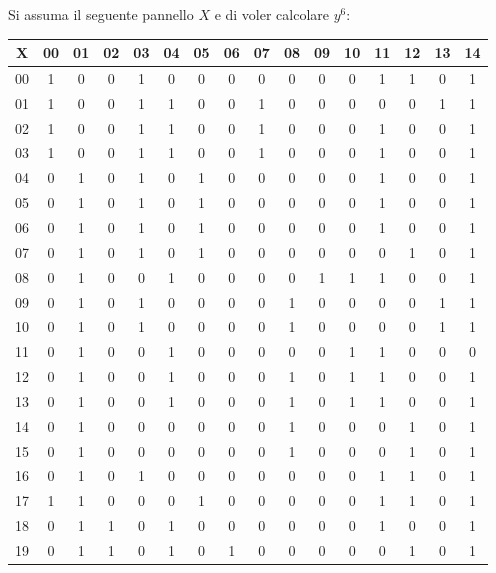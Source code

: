 \begin{esempio}
  \label{es:pbwt1}
  Si assuma il seguente pannello $X$ e di voler calcolare $y^6$:
  \begin{table}[H]
    \centering
    \scriptsize
    \begin{tabular}{c|ccccccccccccccc}
      X & 00 & 01 & 02 & 03 & 04 & 05 & 06 & 07 & 08 & 09 & 10 & 11 & 12 & 13
      & 14 \\
      \hline
      00 & 1 & 0 & 0 & 1 & 0 & 0 & 0 & 0 & 0 & 0 & 0 & 1 & 1 & 0 & 1 \\
      01 & 1 & 0 & 0 & 1 & 1 & 0 & 0 & 1 & 0 & 0 & 0 & 0 & 0 & 1 & 1 \\
      02 & 1 & 0 & 0 & 1 & 1 & 0 & 0 & 1 & 0 & 0 & 0 & 1 & 0 & 0 & 1 \\
      03 & 1 & 0 & 0 & 1 & 1 & 0 & 0 & 1 & 0 & 0 & 0 & 1 & 0 & 0 & 1 \\
      04 & 0 & 1 & 0 & 1 & 0 & 1 & 0 & 0 & 0 & 0 & 0 & 1 & 0 & 0 & 1 \\
      05 & 0 & 1 & 0 & 1 & 0 & 1 & 0 & 0 & 0 & 0 & 0 & 1 & 0 & 0 & 1 \\
      06 & 0 & 1 & 0 & 1 & 0 & 1 & 0 & 0 & 0 & 0 & 0 & 1 & 0 & 0 & 1 \\
      07 & 0 & 1 & 0 & 1 & 0 & 1 & 0 & 0 & 0 & 0 & 0 & 0 & 1 & 0 & 1 \\
      08 & 0 & 1 & 0 & 0 & 1 & 0 & 0 & 0 & 0 & 1 & 1 & 1 & 0 & 0 & 1 \\
      09 & 0 & 1 & 0 & 1 & 0 & 0 & 0 & 0 & 1 & 0 & 0 & 0 & 0 & 1 & 1 \\
      10 & 0 & 1 & 0 & 1 & 0 & 0 & 0 & 0 & 1 & 0 & 0 & 0 & 0 & 1 & 1 \\
      11 & 0 & 1 & 0 & 0 & 1 & 0 & 0 & 0 & 0 & 0 & 1 & 1 & 0 & 0 & 0 \\
      12 & 0 & 1 & 0 & 0 & 1 & 0 & 0 & 0 & 1 & 0 & 1 & 1 & 0 & 0 & 1 \\
      13 & 0 & 1 & 0 & 0 & 1 & 0 & 0 & 0 & 1 & 0 & 1 & 1 & 0 & 0 & 1 \\
      14 & 0 & 1 & 0 & 0 & 0 & 0 & 0 & 0 & 1 & 0 & 0 & 0 & 1 & 0 & 1 \\
      15 & 0 & 1 & 0 & 0 & 0 & 0 & 0 & 0 & 1 & 0 & 0 & 0 & 1 & 0 & 1 \\
      16 & 0 & 1 & 0 & 1 & 0 & 0 & 0 & 0 & 0 & 0 & 0 & 1 & 1 & 0 & 1 \\
      17 & 1 & 1 & 0 & 0 & 0 & 1 & 0 & 0 & 0 & 0 & 0 & 1 & 1 & 0 & 1 \\
      18 & 0 & 1 & 1 & 0 & 1 & 0 & 0 & 0 & 0 & 0 & 0 & 1 & 0 & 0 & 1 \\
      19 & 0 & 1 & 1 & 0 & 1 & 0 & 1 & 0 & 0 & 0 & 0 & 0 & 1 & 0 & 1 

\end{tabular}
\end{table}
\end{esempio}
